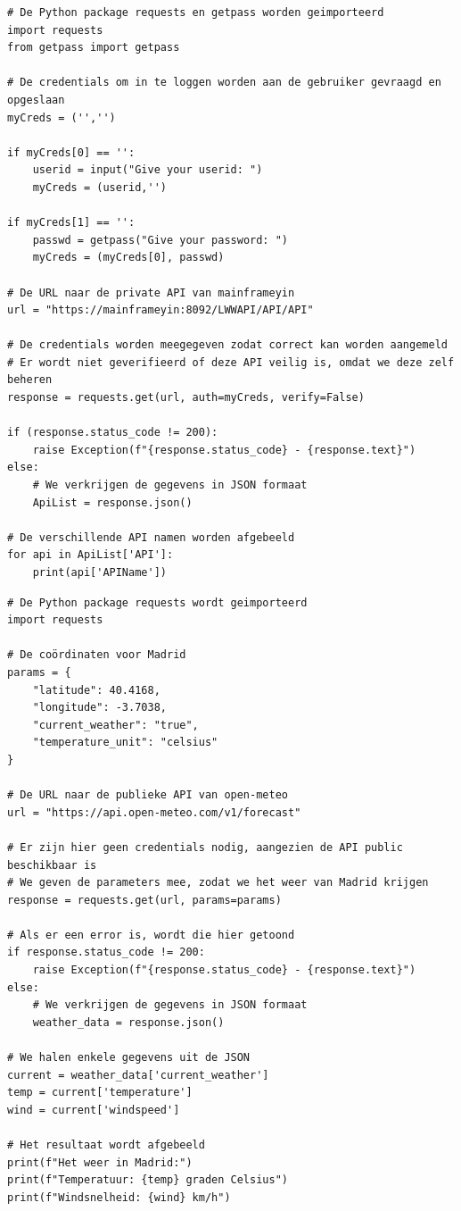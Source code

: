 \begin{verbatim}
# De Python package requests en getpass worden geimporteerd
import requests
from getpass import getpass

# De credentials om in te loggen worden aan de gebruiker gevraagd en opgeslaan
myCreds = ('','')

if myCreds[0] == '':
    userid = input("Give your userid: ")
    myCreds = (userid,'')

if myCreds[1] == '':
    passwd = getpass("Give your password: ")
    myCreds = (myCreds[0], passwd)

# De URL naar de private API van mainframeyin
url = "https://mainframeyin:8092/LWWAPI/API/API"

# De credentials worden meegegeven zodat correct kan worden aangemeld
# Er wordt niet geverifieerd of deze API veilig is, omdat we deze zelf beheren
response = requests.get(url, auth=myCreds, verify=False)

if (response.status_code != 200):
    raise Exception(f"{response.status_code} - {response.text}")
else:
    # We verkrijgen de gegevens in JSON formaat
    ApiList = response.json()

# De verschillende API namen worden afgebeeld
for api in ApiList['API']:
    print(api['APIName'])
\end{verbatim}



\begin{verbatim}
# De Python package requests wordt geimporteerd
import requests

# De coördinaten voor Madrid
params = {
    "latitude": 40.4168,
    "longitude": -3.7038,
    "current_weather": "true",
    "temperature_unit": "celsius"
}

# De URL naar de publieke API van open-meteo
url = "https://api.open-meteo.com/v1/forecast"

# Er zijn hier geen credentials nodig, aangezien de API public beschikbaar is
# We geven de parameters mee, zodat we het weer van Madrid krijgen
response = requests.get(url, params=params)

# Als er een error is, wordt die hier getoond
if response.status_code != 200:
    raise Exception(f"{response.status_code} - {response.text}")
else:
    # We verkrijgen de gegevens in JSON formaat
    weather_data = response.json()

# We halen enkele gegevens uit de JSON
current = weather_data['current_weather']
temp = current['temperature']
wind = current['windspeed']

# Het resultaat wordt afgebeeld
print(f"Het weer in Madrid:")
print(f"Temperatuur: {temp} graden Celsius")
print(f"Windsnelheid: {wind} km/h")
\end{verbatim}



